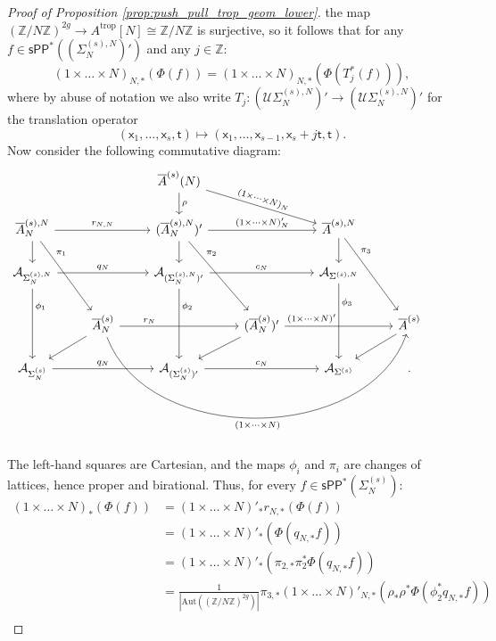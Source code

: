\documentclass[11pt]{article}
\def\Aut{\mathrm{Aut}}
\newcommand{\trop}{\mathrm{trop}}
\newcommand{\barA}{\overline{A}}
\newcommand{\tropA}{{A^{\trop}}}
\newcommand{\sPP}{\mathsf{sPP}}
\newcommand{\spp}{\sPP}
\theoremstyle{definition}
\begin{document}
\begin{proof}[Proof of Proposition \ref{prop:push_pull_trop_geom_lower}]
	the map $(\mathbb{Z}/N\mathbb{Z})^{2g}\to \tropA[N]\cong \mathbb{Z}/N\mathbb{Z}$ is surjective, so it follows
	that for any $f\in \spp^{\ast}((\Sigma_N^{(s),N})')$ and any $j\in \mathbb{Z}$:
	$$(1\times\dots\times N)_{N,\ast}(\Phi(f))=(1\times\dots\times N)_{N,\ast}(\Phi(T_j^{\ast}(f))),$$
	where by abuse of notation we also write $T_j:(\mathcal{U}\Sigma_N^{(s),N})'\to(\mathcal{U}\Sigma_N^{(s),N})'$ for the translation operator
	$$(\mathsf{x}_1,\dots,\mathsf{x}_s,\mathsf{t})\mapsto (\mathsf{x}_1,\dots,\mathsf{x}_{s-1},\mathsf{x}_s+j\mathsf{t},\mathsf{t}).$$
	Now consider the following commutative diagram:
	$$\begin{tikzcd}
		&&\barA^{(s)}(N)\arrow[d,"\rho"]\arrow[rrd,sloped,"(1\times\dots\times N)_N"]&&\\
		\barA_N^{(s),N}\arrow[d]\arrow[rdd,pos=0.25,"\pi_1"]\arrow[rr,"r_{N,N}"]&&(\barA_N^{(s),N})'\arrow[d]\arrow[rdd,pos=0.25,"\pi_2"]\arrow[rr,"(1\times\dots \times N)'_N"]&&\barA^{(s),N}\arrow[d]\arrow[rdd,pos=0.25,"\pi_3"]&\\
		\mathcal{A}_{\Sigma_N^{(s),N}}\arrow[rr,"q_N"]\arrow[dd,pos=0.25,"\phi_1"]&&\mathcal{A}_{(\Sigma_N^{(s),N})'}\arrow[dd,pos=0.25,"\phi_2"]\arrow[rr,"c_N"]&&\mathcal{A}_{\Sigma^{(s),N}}\arrow[dd,pos=0.25,"\phi_3"]&&\\
				&\barA_N^{(s)}\arrow[rr,pos=0.25,"r_N"]\arrow[rrrr,swap,bend right=70,"(1\times\dots\times N)"]\arrow[dl]&&(\barA_N^{(s)})'\arrow[dl]\arrow[rr,pos=0.25,"(1\times\dots\times N)'"]&&\barA^{(s)}\arrow[dl]\\
                \mathcal{A}_{\Sigma_N^{(s)}}\arrow[rr,"q_N"]&&\mathcal{A}_{(\Sigma_N^{(s)})'} \arrow[rr,"c_N"]&&\mathcal{A}_{\Sigma^{(s)}}&.
	\end{tikzcd}$$
	The left-hand squares are Cartesian, and the maps $\phi_i$ and $\pi_i$ are changes of lattices, hence proper and birational. Thus, for every
	$f\in \spp^{\ast}(\Sigma_N^{(s)})$:
    {\allowdisplaybreaks
	\begin{align*}
		(1\times\dots\times N)_{\ast}(\Phi(f))&=(1\times\dots\times N)'_{\ast}r_{N,\ast}(\Phi(f))\\
					                          &=(1\times\dots\times N)'_{\ast}(\Phi(q_{N,\ast}f))\\
											  &=(1\times\dots\times N)'_{\ast}(\pi_{2,\ast}\pi_2^{\ast}\Phi(q_{N,\ast}f))\\
											  &=\frac{1}{|\Aut((\mathbb{Z}/N\mathbb{Z})^{2g})|}\pi_{3,\ast}(1\times\dots\times N)'_{N,\ast}(\rho_{\ast}\rho^{\ast}\Phi(\phi_2^{\ast}q_{N,\ast}f))\\

\end{align*}}
\end{proof}
\end{document}
